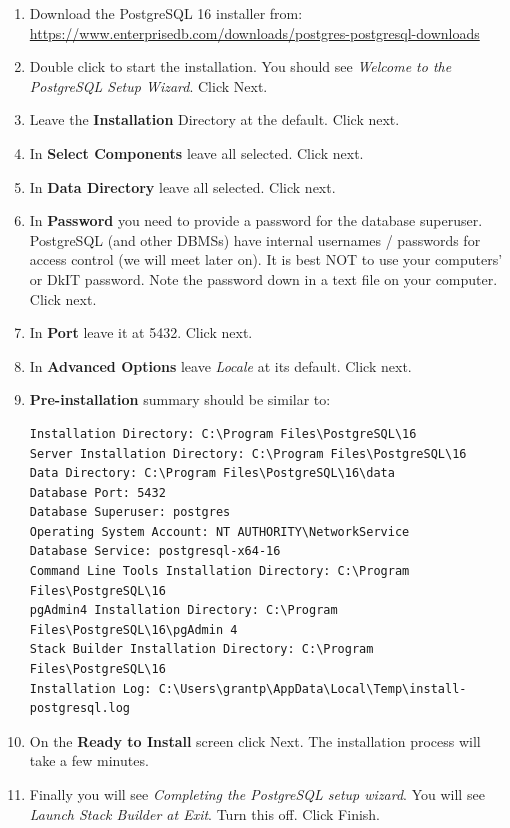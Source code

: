 \documentclass{pgnotes}
\begin{document}
\begin{enumerate}

\item
	Download the PostgreSQL 16 installer from:
	\url{https://www.enterprisedb.com/downloads/postgres-postgresql-downloads}

\item
	Double click to start the installation.
	You should see \textit{Welcome to the PostgreSQL Setup Wizard}.
	Click Next.
	
\item 
	Leave the \textbf{Installation} Directory at the default.
	Click next.
	
\item In \textbf{Select Components} leave all selected.
	Click next.
	
\item In \textbf{Data Directory} leave all selected.
	Click next.
	
\item In \textbf{Password} you need to provide a password for the database superuser.
	PostgreSQL (and other DBMSs) have internal usernames / passwords for access control (we will meet later on).
	It is best NOT to use your computers' or DkIT password.
	Note the password down in a text file on your computer.
	Click next.

\item In \textbf{Port} leave it at 5432.
	Click next.
	
\item In \textbf{Advanced Options} leave \textit{Locale} at its default.
	Click next.

\item \textbf{Pre-installation} summary should be similar to:
\begin{verbatim}
Installation Directory: C:\Program Files\PostgreSQL\16
Server Installation Directory: C:\Program Files\PostgreSQL\16
Data Directory: C:\Program Files\PostgreSQL\16\data
Database Port: 5432
Database Superuser: postgres
Operating System Account: NT AUTHORITY\NetworkService
Database Service: postgresql-x64-16
Command Line Tools Installation Directory: C:\Program Files\PostgreSQL\16
pgAdmin4 Installation Directory: C:\Program Files\PostgreSQL\16\pgAdmin 4
Stack Builder Installation Directory: C:\Program Files\PostgreSQL\16
Installation Log: C:\Users\grantp\AppData\Local\Temp\install-postgresql.log
\end{verbatim}

\item On the \textbf{Ready to Install} screen click Next.
	The installation process will take a few minutes.
	
\item Finally you will see \textit{Completing the PostgreSQL setup wizard}.
	You will see \textit{Launch Stack Builder at Exit}.
	Turn this off.
	Click Finish.
	

\end{enumerate}
	
\end{document}
